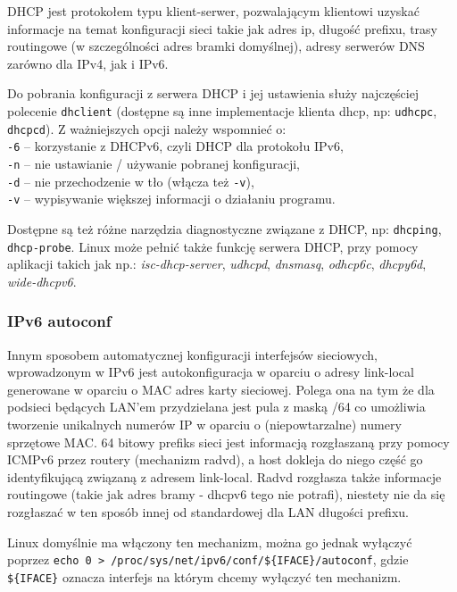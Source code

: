 \documentclass{pdfBooklets}
\begin{document}
DHCP jest protokołem typu klient-serwer, pozwalającym klientowi uzyskać informacje na temat konfiguracji sieci takie jak adres ip, długość prefixu, trasy routingowe (w szczególności adres bramki domyślnej), adresy serwerów DNS zarówno dla IPv4, jak i IPv6.

Do pobrania konfiguracji z serwera DHCP i jej ustawienia służy najczęściej polecenie \Verb#dhclient# (dostępne są inne implementacje klienta dhcp, np: \Verb#udhcpc#, \Verb#dhcpcd#).
Z ważniejszych opcji należy wspomnieć o:\\
	\hspace*{1cm} \Verb#-6# – korzystanie z DHCPv6, czyli DHCP dla protokołu IPv6,\\
	\hspace*{1cm} \Verb#-n# – nie ustawianie / używanie pobranej konfiguracji,\\
	\hspace*{1cm} \Verb#-d# – nie przechodzenie w tło (włącza też \Verb#-v#),\\
	\hspace*{1cm} \Verb#-v# – wypisywanie większej informacji o działaniu programu.

Dostępne są też różne narzędzia diagnostyczne związane z DHCP, np: \Verb#dhcping#, \Verb#dhcp-probe#.
Linux może pełnić także funkcję serwera DHCP, przy pomocy aplikacji takich jak np.: 
	\textit{isc-dhcp-server}, \textit{udhcpd}, \textit{dnsmasq}, \textit{odhcp6c}, \textit{dhcpy6d}, \textit{wide-dhcpv6}.

\subsubsection{IPv6 autoconf}

Innym sposobem automatycznej konfiguracji interfejsów sieciowych, wprowadzonym w IPv6 jest autokonfiguracja w oparciu o adresy link-local generowane w oparciu o MAC adres karty sieciowej.
	Polega ona na tym że dla podsieci będących LAN'em przydzielana jest pula z maską /64 co umożliwia tworzenie unikalnych numerów IP w oparciu o (niepowtarzalne) numery sprzętowe MAC.
	64 bitowy prefiks sieci jest informacją rozgłaszaną przy pomocy ICMPv6 przez routery (mechanizm radvd), a host dokleja do niego część go identyfikującą związaną z adresem link-local.
	Radvd rozgłasza także informacje routingowe (takie jak adres bramy - dhcpv6 tego nie potrafi), niestety nie da się rozgłaszać w ten sposób innej od standardowej dla LAN długości prefixu.

Linux domyślnie ma włączony ten mechanizm, można go jednak wyłączyć poprzez \Verb#echo 0 > /proc/sys/net/ipv6/conf/${IFACE}/autoconf#, gdzie \Verb#${IFACE}# oznacza interfejs na którym chcemy wyłączyć ten mechanizm.
\end{document}
